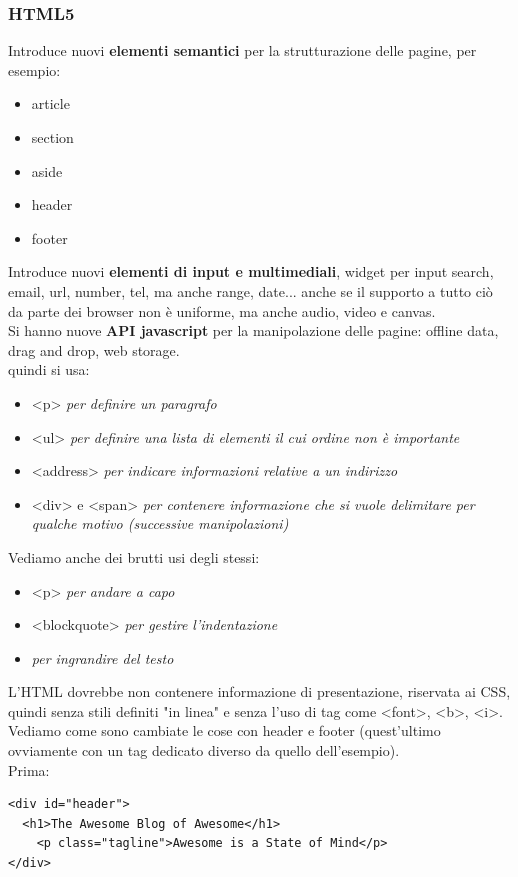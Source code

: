 \documentclass[a4paper,12pt, oneside]{book}
\begin{document}
\subsubsection{HTML5}
Introduce nuovi \textbf{elementi semantici} per la strutturazione delle pagine, per esempio:
\begin{itemize}
\item article
\item section
\item aside
\item header
\item footer
\end{itemize}
Introduce nuovi \textbf{elementi di input e multimediali}, widget per input search, email, url, number, tel, ma anche range, date... anche se il supporto a tutto ciò da parte dei browser non è uniforme, ma anche audio, video e canvas.\\
Si hanno nuove \textbf{API javascript} per la manipolazione delle pagine: offline data, drag and drop, web storage.\\
quindi si usa:
\begin{itemize}
\item <p> \textit{per definire un paragrafo}
\item <ul> \textit{per definire una lista di elementi il cui ordine non è importante}
\item <address> \textit{per indicare informazioni relative a un indirizzo}
\item <div> e <span> \textit{per contenere informazione che si vuole delimitare per qualche motivo (successive manipolazioni)}
\end{itemize}
Vediamo anche dei brutti usi degli stessi:
\begin{itemize}
\item <p> \textit{per andare a capo}
\item <blockquote> \textit{per gestire l'indentazione}
\item <h1> \textit{per ingrandire del testo}
\end{itemize}
L’HTML dovrebbe non contenere informazione di presentazione, riservata ai CSS, quindi senza stili definiti "in linea" e senza l'uso di tag come <font>, <b>, <i>. \\
Vediamo come sono cambiate le cose con header e footer (quest'ultimo ovviamente con un tag dedicato diverso da quello dell'esempio). \\
Prima:
\begin{verbatim}
<div id="header">
  <h1>The Awesome Blog of Awesome</h1>
    <p class="tagline">Awesome is a State of Mind</p>
</div>
\end{verbatim}
\end{document}
